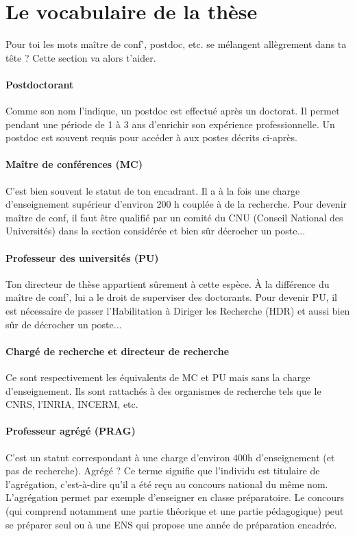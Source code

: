 \section{Le vocabulaire de la thèse}\trad
Pour toi les mots maître de conf', postdoc, etc. se mélangent allègrement dans ta tête ?
Cette section va alors t'aider.
\paragraph{Postdoctorant}
Comme son nom l'indique, un postdoc est effectué après un doctorat.
Il permet pendant une période de 1 à 3 ans d'enrichir son expérience professionnelle.
Un postdoc est souvent requis pour accéder à aux postes décrits ci-après.
\paragraph{Maître de conférences (MC)}
C'est bien souvent le statut de ton encadrant.
Il a à la fois une charge d'enseignement supérieur d'environ 200 h couplée à de la recherche.
Pour devenir maître de conf, il faut être qualifié par un comité du CNU (Conseil National des Universités) dans la section considérée et bien sûr décrocher un poste...
\paragraph{Professeur des universités (PU)}
Ton directeur de thèse appartient sûrement à cette espèce.
À la différence du maître de conf', lui a le droit de superviser des doctorants.
Pour devenir PU, il est nécessaire de passer l'Habilitation à Diriger les Recherche (HDR) et aussi bien sûr de décrocher un poste...
\paragraph{Chargé de recherche et directeur de recherche}
Ce sont respectivement les équivalents de MC et PU mais sans la charge d'enseignement.
Ils sont rattachés à des organismes de recherche tels que le CNRS, l'INRIA, INCERM, etc.
\paragraph{Professeur agrégé (PRAG)} C'est un statut correspondant à une charge d'environ 400h d'enseignement (et pas de recherche).
Agrégé ? Ce terme signifie que l'individu est titulaire de l'agrégation, c'est-à-dire qu'il a été reçu au concours national du même nom.
L'agrégation permet par exemple d'enseigner en classe préparatoire.
Le concours (qui comprend notamment une partie théorique et une partie pédagogique) peut se préparer seul ou à une ENS qui propose une année de préparation encadrée.

